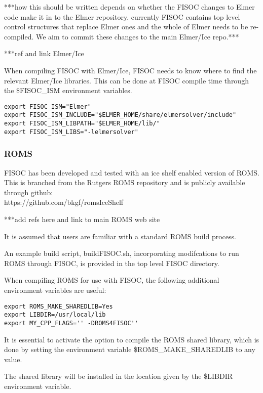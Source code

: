 \documentclass[12pt]{article}
\begin{document}
***how this should be written depends on whether the FISOC changes to 
Elmer code make it in to the Elmer repository. currently FISOC contains 
top level control structures that replace Elmer ones and the whole of 
Elmer needs to be re-compiled.  We aim to commit these changes to the 
main Elmer/Ice repo.***

***ref and link Elmer/Ice

When compiling FISOC with Elmer/Ice, FISOC needs to know where to 
find the relevant Elmer/Ice libraries.  
This can be done at FISOC compile time through the 
\$FISOC\_ISM
environment variables.  


\begin{lstlisting}
export FISOC_ISM="Elmer"
export FISOC_ISM_INCLUDE="$ELMER_HOME/share/elmersolver/include"
export FISOC_ISM_LIBPATH="$ELMER_HOME/lib/"
export FISOC_ISM_LIBS="-lelmersolver"
\end{lstlisting}

\subsubsection{ROMS}
\label{sec:PreReqROMS}

FISOC has been developed and tested with an ice shelf enabled version of ROMS. 
This is branched from the Rutgers ROMS repository and is publicly available 
through github: \\
https://github.com/bkgf/romsIceShelf

***add refs here and link to main ROMS web site

It is assumed that users are familiar with a standard ROMS build process. 

An example build script, buildFISOC.sh, incorporating modifcations 
to run ROMS through FISOC, is provided in the top level FISOC directory.

When compiling ROMS for use with FISOC, the following additional environment
variables are useful:
\begin{lstlisting}
export ROMS_MAKE_SHAREDLIB=Yes
export LIBDIR=/usr/local/lib
export MY_CPP_FLAGS='' -DROMS4FISOC''
\end{lstlisting}

It is essential to activate the option 
to compile the ROMS shared library, which 
is done by setting the environment variable \$ROMS\_MAKE\_SHAREDLIB to any value. 

The shared library will be installed in the location given by the 
 \$LIBDIR environment variable. 
\end{document}
